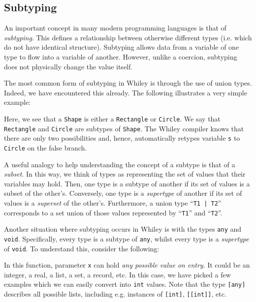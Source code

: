 \subsection{Subtyping}

An important concept in many modern programming languages is that of {\em subtyping}.  This defines a relationship between otherwise different types (i.e. which do not have identical structure).  Subtyping allows data from a variable of one type to flow into a variable of another.  However, unlike a coercion, subtyping does not physically change the value itself.  

The most common form of subtyping in Whiley is through the use of union types.  Indeed, we have encountered this already.  The following illustrates a very simple example:



Here, we see that a \lstinline{Shape} is either a \lstinline{Rectangle} or \lstinline{Circle}.  We say that \lstinline{Rectangle} and \lstinline{Circle} are subtypes of \lstinline{Shape}.  The Whiley compiler knows that there are only two possibilities and, hence, automatically retypes variable \lstinline{s} to \lstinline{Circle} on the false branch.

\begin{insight}
A useful analogy to help understanding the concept of a subtype is that of a {\em subset}.  In this way, we think of types as representing the set of values that their variables may hold.  Then, one type is a subtype of another if its set of values is a subset of the other's.  Conversely, one type is a {\em supertype} of another if its set of values is a {\em superset} of the other's.  Furthermore, a union type ``\lstinline{T1 | T2}'' corresponds to a set union of those values represented by ``\lstinline{T1}'' and ``\lstinline{T2}''.
\end{insight}

Another situation where subtyping occurs in Whiley is with the types \lstinline{any} and \lstinline{void}.  Specifically, every type is a subtype of \lstinline{any}, whilst every type is a {\em supertype} of \lstinline{void}.  To understand this, consider the following:



In this function, parameter \lstinline{x} can hold {\em any possible value on entry}.  It could be an integer, a real, a list, a set, a record, etc.  In this case, we have picked a few examples which we can easily convert into \lstinline{int} values.  Note that the type \lstinline{[any]} describes all possible lists, including e.g. instances of \lstinline{[int]}, \lstinline{[[int]]}, etc.

